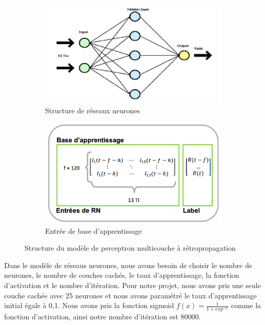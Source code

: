 \begin{figure}[H]
	\centering
	\begin{subfigure}{.5\textwidth}
	\includegraphics[width=.9\linewidth, scale=0.2]
	{plot/RN.png}
	\caption{Structure de réseaux neurones}
	\label{fig:RN}
	\end{subfigure}%
	\begin{subfigure}{.5\textwidth}
	\centering
	\includegraphics[width=.9\linewidth, scale=0.2]
	{plot/base.png}
	\caption{Entrée de base d'apprentissage}
	\label{fig:base}
	\end{subfigure}
\caption{Structure du modèle de perceptron multicouche à rétropropagation}
\label{fig:structure_rn}
\end{figure}

Dans le modèle de réseaus neurones, nous avons besoin de choisir le nombre de neurones, le nombre de couches cachés, le taux d'apprentissage, la fonction d’activation et le nombre d'itération. Pour notre projet, nous avons pris une seule couche cachée avec 25 neurones et nous avons paramétré le taux d'apprentissage initial égale à 0,1. Nous avons pris la fonction sigmoid $ f(x) = \frac{1}{1 + exp^{-x}} $ comme la fonction d'activation, ainsi notre nombre d'itération est 80000.

